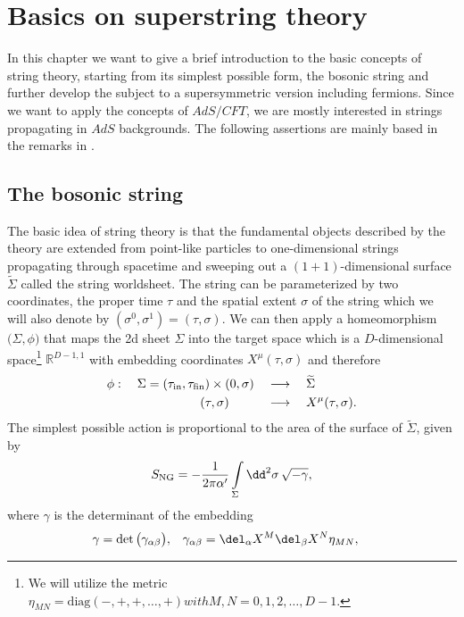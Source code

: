 \section{Basics on superstring theory}
In this chapter we want to give a brief introduction to the basic concepts of string theory, starting from its simplest possible form, the bosonic string and further develop the subject to a supersymmetric version including fermions. Since we want to apply the concepts of $AdS/CFT$, we are mostly interested in strings propagating in $AdS$ backgrounds. The following assertions are mainly based in the remarks in \cite{Polchinski:1998rq,Polchinski:1998rr}.
%
%
%
%
%
%
%
\subsection{The bosonic string}
The basic idea of string theory is that the fundamental objects described by the theory are extended from point-like particles to one-dimensional strings propagating through spacetime and sweeping out a $(1+1)$-dimensional surface $\widetilde{\Sigma}$ called the string worldsheet. The string can be parameterized by two coordinates, the proper time $\tau$ and the spatial extent $\sigma$ of the string which we will also denote by $(\sigma^{0},\sigma^{1})=(\tau,\sigma)$. We can then apply a homeomorphism $\big(\Sigma,\phi)$ that maps the 2d sheet $\Sigma$ into the target space which is a $D$-dimensional  space\footnote{We will utilize the metric $\eta_{MN}=\text{diag}(-,+,+,\ldots,+) with M,N=0,1,2,\ldots,D-1.$} $\mathbb{R}^{D-1,1}$ with embedding coordinates $X^{\mu}(\tau,\sigma)$ and therefore
%
%
\begin{equation}
\begin{alignedat}{3}
\phi :\quad  \Sigma = (\tau_{\rm in},\tau_{\rm fin}) \times (0,\sigma) \quad &\longrightarrow \quad \widetilde{\Sigma} \\
(\tau,\sigma) \qquad\quad &\longrightarrow \quad X^{\mu}(\tau,\sigma). 
\end{alignedat}
\end{equation}
%
%
The simplest possible action is proportional to the area of the surface of $\widetilde{\Sigma}$, given by
%
%
\begin{equation}
S_{\rm NG} = -\frac{1}{2\pi\alpha'} \int\limits_{\Sigma} \dd^{2}\sigma \, \sqrt{-\gamma},
\end{equation}
%
%
where $\gamma$ is the  determinant of the embedding
%
%
\begin{align}
\gamma &= \det \big(\gamma_{\alpha\beta}\big), & \gamma_{\alpha\beta} &= \del_{\alpha}X^{M}\del_{\beta}X^{N}\eta_{MN},
\end{align}
